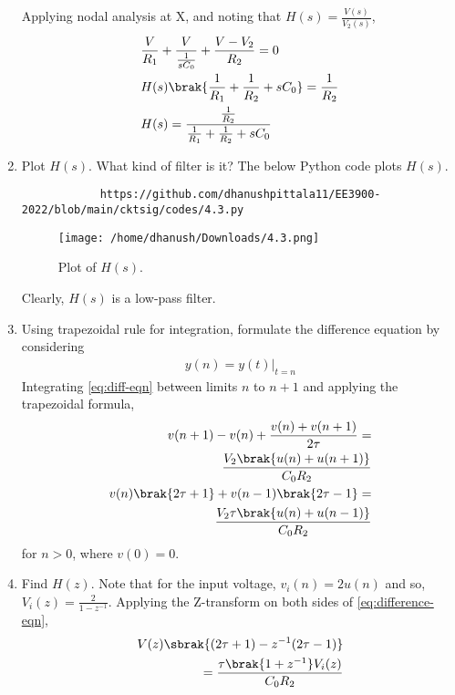 \documentclass[journal,12pt,twocolumn]{IEEEtran}
\renewcommand\thesection{\arabic{section}}
\begin{document}
\begin{enumerate}[label=\arabic*.,ref=\thesection.\theenumi]
\begin{figure}[!htb]
\begin{center}
			\end{center}
			\caption{}
			\label{fig:sckt-q4}
		\end{figure}
		Applying nodal analysis at X, and noting that 
		$H(s) = \frac{V(s)}{V_2(s)}$,
		\begin{align}
			&\frac{V}{R_1} + \frac{V}{\frac{1}{sC_0}} + \frac{V - V_2}{R_2} = 0 \\
			&H(s)\brak{\frac{1}{R_1} + \frac{1}{R_2} + sC_0} = \frac{1}{R_2} \\
			&H(s) = \frac{\frac{1}{R_2}}{\frac{1}{R_1} + \frac{1}{R_2} + sC_0}
			\label{eq:Hs}
		\end{align}
		\item Plot $H(s)$. What kind of filter is it?
		\solution The below Python code plots $H(s)$.
		\begin{lstlisting}
			https://github.com/dhanushpittala11/EE3900-2022/blob/main/cktsig/codes/4.3.py
		\end{lstlisting}
		\begin{figure}[!ht]
			\texttt{[image: /home/dhanush/Downloads/4.3.png]}
			\caption{Plot of $H(s)$.}
			\label{fig:Hs}
		\end{figure}
		Clearly, $H(s)$ is a low-pass filter.
		\item Using trapezoidal rule for integration, formulate the difference
		equation by considering 
		\begin{align}
			y(n) = y(t)\vert_{t=n}
		\end{align}
		\solution Integrating \eqref{eq:diff-eqn} between limits $n$ to $n+1$ 
		and applying the trapezoidal formula,
		\begin{align}
			v(n+1) - v(n) + \frac{v(n) + v(n+1)}{2\tau} = \nonumber\\
			\frac{V_2\brak{u(n)+u(n+1)}}{C_0R_2} \\
			v(n)\brak{2\tau+1} + v(n-1)\brak{2\tau-1} = \nonumber\\ 
			\frac{V_2\tau\brak{u(n)+u(n-1)}}{C_0R_2}
			\label{eq:difference-eqn}
		\end{align}
		for $n > 0$, where $v(0) = 0$.
		\item Find $H(z)$.
		\solution Note that for the input voltage, $v_i(n) = 2u(n)$ and
		so, $V_i(z) = \frac{2}{1-z^{-1}}$. Applying the Z-transform
		on both sides of \eqref{eq:difference-eqn},
		\begin{align}
			V(z)\sbrak{(2\tau + 1) - z^{-1}(2\tau - 1)} \nonumber \\
			= \frac{\tau\brak{1 + z^{-1}}V_i(z)}{C_0R_2}
		\end{align}

\end{enumerate}
\end{document}
